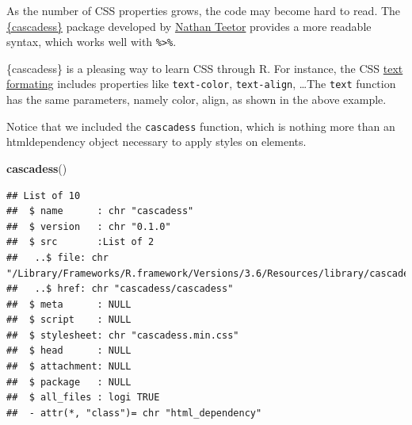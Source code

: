 \documentclass[
]{book}
\newenvironment{Shaded}{\begin{snugshade}}{\end{snugshade}}
\newcommand{\ControlFlowTok}[1]{\textcolor[rgb]{0.13,0.29,0.53}{\textbf{#1}}}
\newcommand{\DataTypeTok}[1]{\textcolor[rgb]{0.13,0.29,0.53}{#1}}
\newcommand{\DecValTok}[1]{\textcolor[rgb]{0.00,0.00,0.81}{#1}}
\newcommand{\KeywordTok}[1]{\textcolor[rgb]{0.13,0.29,0.53}{\textbf{#1}}}
\newcommand{\NormalTok}[1]{#1}
\newcommand{\OperatorTok}[1]{\textcolor[rgb]{0.81,0.36,0.00}{\textbf{#1}}}
\newcommand{\StringTok}[1]{\textcolor[rgb]{0.31,0.60,0.02}{#1}}
\begin{document}
As the number of CSS properties grows, the code may become hard to read. The \href{https://github.com/nteetor/cascadess}{\{cascadess\}} package developed by \href{}{Nathan Teetor} provides a more readable syntax, which works well with \texttt{\%\textgreater{}\%}.

\begin{Shaded}
\end{Shaded}

\{cascadess\} is a pleasing way to learn CSS through R. For instance, the CSS \href{https://www.google.com/search?client=safari\&rls=en\&q=text+properties+css\&ie=UTF-8\&oe=UTF-8}{text formating} includes properties like \texttt{text-color}, \texttt{text-align}, \ldots The \texttt{text} function has the same parameters, namely color, align, as shown in the above example.

Notice that we included the \texttt{cascadess} function, which is nothing more than an htmldependency object necessary to apply styles on elements.

\begin{Shaded}
\begin{Highlighting}[]
\KeywordTok{cascadess}\NormalTok{()}
\end{Highlighting}
\end{Shaded}

\begin{verbatim}
## List of 10
##  $ name      : chr "cascadess"
##  $ version   : chr "0.1.0"
##  $ src       :List of 2
##   ..$ file: chr "/Library/Frameworks/R.framework/Versions/3.6/Resources/library/cascadess/www/cascadess"
##   ..$ href: chr "cascadess/cascadess"
##  $ meta      : NULL
##  $ script    : NULL
##  $ stylesheet: chr "cascadess.min.css"
##  $ head      : NULL
##  $ attachment: NULL
##  $ package   : NULL
##  $ all_files : logi TRUE
##  - attr(*, "class")= chr "html_dependency"
\end{verbatim}
\end{document}
